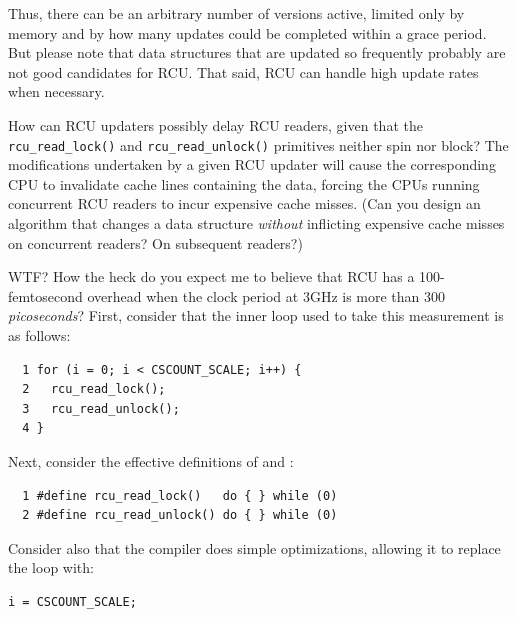	Thus, there can be an arbitrary number of versions active,
	limited only by memory and by how many updates could be completed
	within a grace period.
	But please note that data structures that are updated so frequently
	probably are not good candidates for RCU.
	That said, RCU can handle high update rates when necessary.

\QuickQ{}
	How can RCU updaters possibly delay RCU readers, given that the
	{\tt rcu\_read\_lock()} and {\tt rcu\_read\_unlock()}
	primitives neither spin nor block?
\QuickA{}
	The modifications undertaken by a given RCU updater will cause the
	corresponding CPU to invalidate cache lines containing the data,
	forcing the CPUs running concurrent RCU readers to incur expensive
	cache misses.
	(Can you design an algorithm that changes a data structure
	\emph{without}
	inflicting expensive cache misses on concurrent readers?
	On subsequent readers?)

\QuickQ{}
	WTF?
	How the heck do you expect me to believe that RCU has a
	100-femtosecond overhead when the clock period at 3GHz is more than
	300 \emph{picoseconds}?
\QuickA{}
	First, consider that the inner loop used to
	take this measurement is as follows:

\vspace{5pt}
\begin{minipage}[t]{\columnwidth}
\scriptsize
\begin{verbatim}
  1 for (i = 0; i < CSCOUNT_SCALE; i++) {
  2   rcu_read_lock();
  3   rcu_read_unlock();
  4 }
\end{verbatim}
\end{minipage}
\vspace{5pt}

	Next, consider the effective definitions of 
	and :

\vspace{5pt}
\begin{minipage}[t]{\columnwidth}
\scriptsize
\begin{verbatim}
  1 #define rcu_read_lock()   do { } while (0)
  2 #define rcu_read_unlock() do { } while (0)
\end{verbatim}
\end{minipage}
\vspace{5pt}

	Consider also that the compiler does simple optimizations,
	allowing it to replace the loop with:

\vspace{5pt}
\begin{minipage}[t]{\columnwidth}
\scriptsize
\begin{verbatim}
i = CSCOUNT_SCALE;
\end{verbatim}
\end{minipage}
\vspace{5pt}

